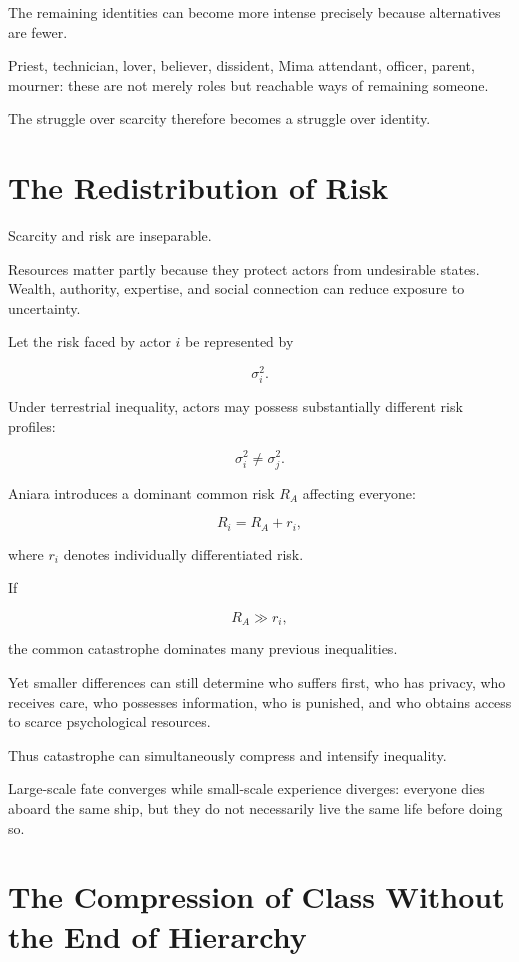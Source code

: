 \documentclass[11pt,oneside]{book}
\theoremstyle{definition}
\theoremstyle{remark}
\begin{document}
The remaining identities can become more intense precisely because alternatives are fewer.

Priest, technician, lover, believer, dissident, Mima attendant, officer, parent, mourner: these are not merely roles but reachable ways of remaining someone.

The struggle over scarcity therefore becomes a struggle over identity.

\section{The Redistribution of Risk}

Scarcity and risk are inseparable.

Resources matter partly because they protect actors from undesirable states. Wealth, authority, expertise, and social connection can reduce exposure to uncertainty.

Let the risk faced by actor \(i\) be represented by

\[
\sigma_i^2.
\]

Under terrestrial inequality, actors may possess substantially different risk profiles:

\[
\sigma_i^2\neq\sigma_j^2.
\]

Aniara introduces a dominant common risk \(R_A\) affecting everyone:

\[
R_i
=
R_A+r_i,
\]

where \(r_i\) denotes individually differentiated risk.

If

\[
R_A\gg r_i,
\]

the common catastrophe dominates many previous inequalities.

Yet smaller differences can still determine who suffers first, who has privacy, who receives care, who possesses information, who is punished, and who obtains access to scarce psychological resources.

Thus catastrophe can simultaneously compress and intensify inequality.

Large-scale fate converges while small-scale experience diverges: everyone dies aboard the same ship, but they do not necessarily live the same life before doing so.

\section{The Compression of Class Without the End of Hierarchy}
\end{document}
